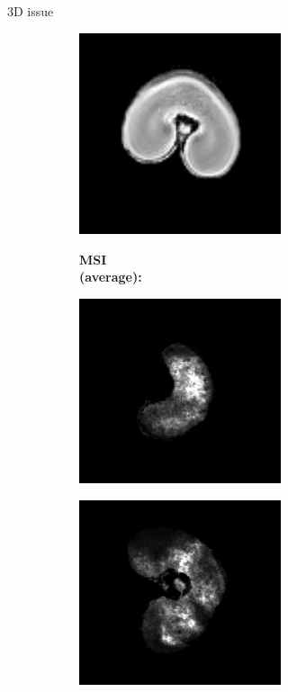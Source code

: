 \documentclass[10pt]{beamer}
\begin{document}
\begin{frame}{3D issue}
\begin{figure}[ht]
\begin{subfigure}[c]{0.3\textwidth}
     \end{subfigure}%
     \begin{subfigure}[c]{0.3\textwidth}
       \centering
       \includegraphics[width=0.65\textwidth]{fig/3D_density_aligned_manual0006}%
     \end{subfigure}
     \begin{subfigure}[b]{0.15\textwidth}  
       \textbf{MSI \\ (average):}%
     \end{subfigure}%
     \begin{subfigure}[c]{0.3\textwidth}
       \centering
       \includegraphics[width=0.65\textwidth]{fig/3D_segmentation0000}%
     \end{subfigure}%
     \begin{subfigure}[c]{0.3\textwidth}
       \centering
       \includegraphics[width=0.65\textwidth]{fig/3D_segmentation0003}%

\end{subfigure}
\end{figure}
\end{frame}
\end{document}
